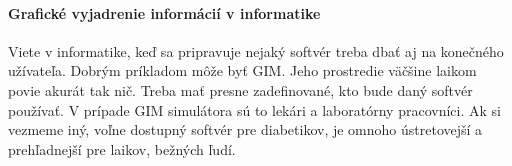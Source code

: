 \paragraph{Grafické vyjadrenie informácií v informatike}
Viete v informatike, keď sa pripravuje nejaký softvér treba dbať aj na konečného užívateľa. Dobrým príkladom môže byť GIM. Jeho prostredie väčšine laikom povie akurát tak nič. Treba mať presne zadefinované, kto bude daný softvér používať. V prípade GIM simulátora sú to lekári a laboratórny pracovníci. Ak si vezmeme iný, voľne dostupný softvér pre diabetikov, je omnoho ústretovejší a prehľadnejší pre laikov, bežných ľudí.
